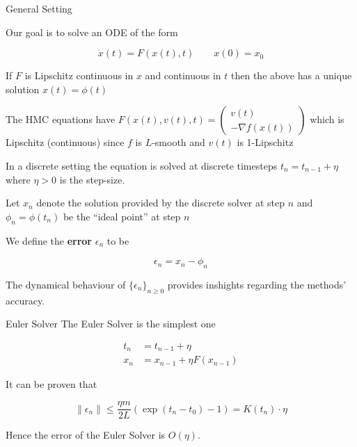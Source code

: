 \documentclass[10pt]{beamer}
\begin{document}
\begin{frame}[allowframebreaks]{General Setting}

Our goal is to solve an ODE of the form 

$$\dot x(t) = F(x(t), t) \qquad x(0) = x_0$$

\begin{theorem}
If $F$ is Lipschitz continuous in $x$ and continuous in $t$ then the above has a unique solution $x(t) = \phi(t)$
\end{theorem}

The HMC equations have $F(x(t), v(t), t) = \begin{pmatrix} v(t) \\ - \nabla f(x(t)) \end{pmatrix}$ which is Lipschitz (continuous) since $f$ is $L$-smooth and $v(t)$ is 1-Lipschitz

\framebreak

In a discrete setting the equation is solved at discrete timesteps $t_n = t_{n - 1} + \eta$ where $\eta > 0$ is the step-size. 

\medskip

Let $x_n$ denote the solution provided by the discrete solver at step $n$ and $\phi_n = \phi(t_n)$ be the ``ideal point'' at step $n$
     
\medskip 

We define the \textbf{error} $\epsilon_n$ to be 

$$\epsilon_n = x_n - \phi_n$$

The dynamical behaviour of $ \{ \epsilon_n \}_{n \ge 0}$ provides inshights regarding the methods' accuracy.  

\end{frame}

\begin{frame}{Euler Solver}
    The Euler Solver is the simplest one
    
    \begin{align*}
        t_n & = t_{n - 1} + \eta \\
        x_n & = x_{n - 1} + \eta F(x_{n - 1})
    \end{align*}
    
    It can be proven that 
    
    $$\| \epsilon_n \| \le \frac {\eta m} {2L} \left ( \exp(t_n - t_0) - 1 \right ) = K(t_n) \cdot \eta$$
    
    Hence the error of the Euler Solver is $O(\eta)$. 
    
\end{frame}
\end{document}
